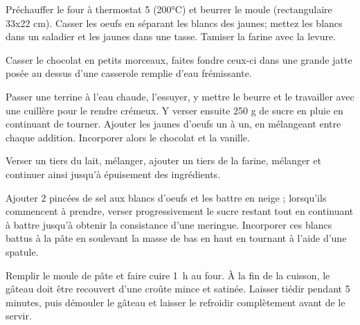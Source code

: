 \begin{etapes}
\item Préchauffer le four à thermostat 5 (200°C) et beurrer le moule (rectangulaire 33x22 cm).
Casser les oeufs en séparant les blancs des jaunes; mettez les blancs dans un saladier et les jaunes dans une tasse.
Tamiser la farine avec la levure.
\item Casser le chocolat en petits morceaux, faites fondre ceux-ci dans une grande jatte posée au dessus d'une casserole remplie d'eau frémissante.
\item Passer une terrine à l'eau chaude, l'essuyer, y mettre le beurre et le travailler avec une cuillère pour le rendre crémeux.
Y verser ensuite 250 g de sucre en pluie en continuant de tourner.
Ajouter les jaunes d'oeufs un à un, en mélangeant entre chaque addition.
Incorporer alors le chocolat et la vanille.
\item Verser un tiers du lait, mélanger, ajouter un tiers de la farine, mélanger et continuer ainsi jusqu'à épuisement des ingrédients.
\item Ajouter 2 pincées de sel aux blancs d'oeufs et les battre en neige ; lorsqu'ils commencent à prendre, verser progressivement le sucre restant tout en continuant à battre jusqu'à obtenir la consistance d'une meringue.
Incorporer ces blancs battus à la pâte en soulevant la masse de bas en haut en tournant à l'aide d'une spatule.
\item Remplir le moule de pâte et faire cuire 1~h au four. À la fin de la cuisson, le gâteau doit être recouvert d'une croûte mince et satinée. Laisser tiédir pendant 5 minutes, puis démouler le gâteau et laisser le refroidir complètement avant de le servir.
\end{etapes}
\begin{conseils}
\end{conseils}
